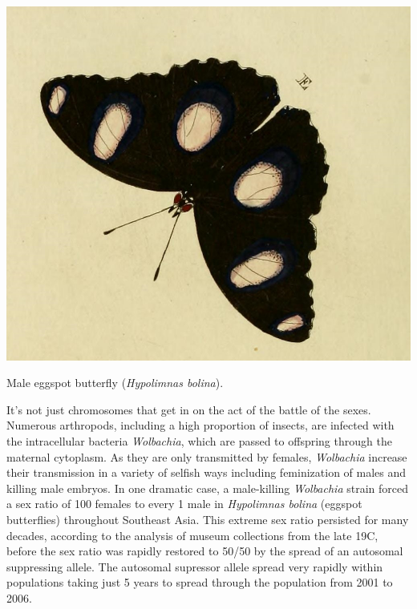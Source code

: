 {  \begin{marginfigure}
\begin{center}
\includegraphics[width= \textwidth]{illustration_images/single_locus_selection/Hypolimnas_bolina/Hypolimnas_bolina.png}
\end{center}
\caption{Male eggspot butterfly ({\it Hypolimnas bolina}).  } \label{fig:Hypolimnas_bolina}
\end{marginfigure}  %

It's not just chromosomes that get in on the act of the battle
of the sexes.  Numerous arthropods, including a high proportion of
insects, are infected with the intracellular bacteria {\it
  Wolbachia}, which are passed to offspring through the
maternal cytoplasm. As they are only transmitted by females, {\it
  Wolbachia} increase their transmission in a variety of selfish ways
including feminization of males and killing male embryos. In one
dramatic case, a male-killing {\it Wolbachia} strain forced a sex ratio of 100 females
to every 1 male in {\it Hypolimnas bolina} (eggspot butterflies)
throughout Southeast Asia. This extreme sex ratio persisted for many decades,
according to the analysis of museum collections from the late 19C,
before the sex ratio was rapidly restored to 50/50 by the spread of an
autosomal suppressing allele. The autosomal supressor allele 
spread very rapidly within populations taking just 5 years to spread
through the population from 2001 to 2006. 

}
